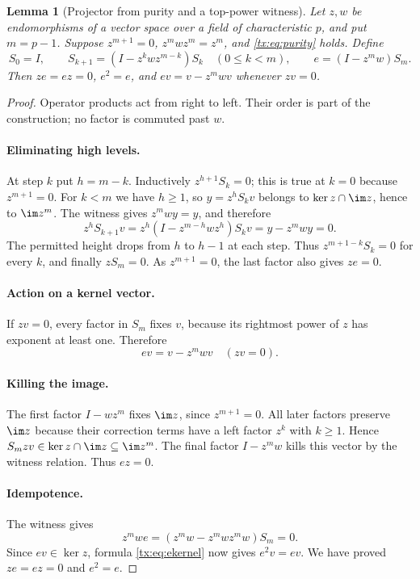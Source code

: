 \documentclass[11pt,a4paper,oneside,openany]{book}
\newtheorem{lemma}[theorem]{Lemma}
\theoremstyle{definition}\newtheorem{definition}[theorem]{Definition}
\theoremstyle{remark}\newtheorem{remark}[theorem]{Remark}
\numberwithin{equation}{chapter}
\begin{document}
\begin{lemma}[Projector from purity and a top-power witness]\label{tx:lem:prime-projector}
Let $z,w$ be endomorphisms of a vector space over a field of
characteristic $p$, and put $m=p-1$. Suppose $z^{m+1}=0$,
$z^mwz^m=z^m$, and \eqref{tx:eq:purity} holds. Define
\begin{equation}\label{tx:eq:prime-projector}
S_0=I,\qquad S_{k+1}=(I-z^kwz^{m-k})S_k\quad(0\le k<m),
\qquad e=(I-z^mw)S_m.
\end{equation}
Then $ze=ez=0$, $e^2=e$, and $ev=v-z^mwv$ whenever $zv=0$.
\end{lemma}
\begin{proof}
Operator products act from right to left. Their order is part of the
construction; no factor is commuted past $w$.

\paragraph{Eliminating high levels.}
At step $k$ put $h=m-k$. Inductively $z^{h+1}S_k=0$; this is
true at $k=0$ because $z^{m+1}=0$. For $k<m$ we have $h\ge1$, so
$y=z^hS_kv$ belongs to $\ker z\cap\im z$, hence to $\im z^m$.
The witness gives $z^mwy=y$, and therefore
\[
 z^hS_{k+1}v
       =z^h(I-z^{m-h}wz^h)S_kv=y-z^mwy=0.
\]
The permitted height drops from $h$ to $h-1$ at each step. Thus
$z^{m+1-k}S_k=0$ for every $k$, and finally $zS_m=0$.
As $z^{m+1}=0$, the last factor also gives $ze=0$.

\paragraph{Action on a kernel vector.}
If $zv=0$, every factor in $S_m$ fixes $v$, because its rightmost power of $z$ has exponent at least one. Therefore
\begin{equation}\label{tx:eq:ekernel}ev=v-z^mwv\quad(zv=0).
\end{equation}

\paragraph{Killing the image.}
The first factor $I-wz^m$ fixes $\im z$, since $z^{m+1}=0$. All later factors preserve $\im z$ because their correction terms have a left factor $z^k$ with $k\ge1$. Hence $S_mzv\in\ker z\cap\im z\subseteq\im z^m$. The final factor $I-z^mw$ kills this vector by the witness relation. Thus $ez=0$.

\paragraph{Idempotence.}
The witness gives
\[z^mwe=(z^mw-z^mwz^mw)S_m=0.
\]
Since $ev\in\ker z$, formula \eqref{tx:eq:ekernel} now gives $e^2v=ev$. We have proved $ze=ez=0$ and $e^2=e$.
\end{proof}
\end{document}
